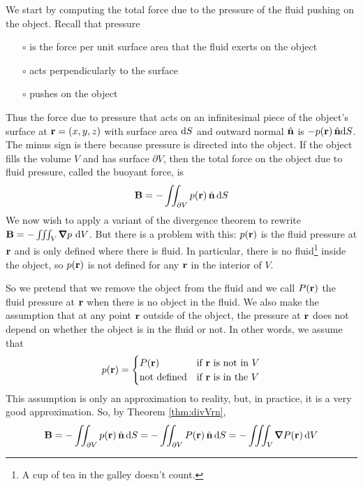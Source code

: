We start by computing the total force due to the pressure of the fluid
pushing on the object. Recall that pressure
\begin{itemize}\itemsep1pt \parskip0pt  %
\item[$\circ$]
is the force per unit surface area that the fluid exerts on the object
\item[$\circ$]
acts perpendicularly to the surface
\item[$\circ$]
pushes on the object
\end{itemize}
Thus the force due to pressure that acts on an infinitesimal
piece of the object's surface at $\mathbf{r}=(x,y,z)$ with surface area $\mathrm{d}S$ and 
outward normal $\hat{\mathbf{n}}$ is $-p(\mathbf{r})\,\hat{\mathbf{n}} \mathrm{d}S$. The minus sign is there because pressure is directed into the object. 
If the object fills the volume $V$ and has surface $\partial
V$, then the total force on the object due to fluid pressure, called
the buoyant force,  is
\begin{equation*}
\mathbf{B}=-\iint_{\partial V}p(\mathbf{r})\,\hat{\mathbf{n}}\,\mathrm{d}S
\end{equation*}
We now wish to apply a variant of the divergence theorem to rewrite
$\vB=-\tripInt_V \vnabla p\ \dee{V}$. But there is a problem with this:
$p(\mathbf{r})$ is the fluid pressure at $\mathbf{r}$ and is only defined where there is
fluid. In particular, there is no fluid\footnote{A cup of tea in the galley 
doesn't count.} inside the object, so $p(\mathbf{r})$ is not
defined for any $\mathbf{r}$ in the interior of $V$. 

So we pretend that we remove 
the object from the fluid and we call $P(\mathbf{r})$ the fluid pressure at $\mathbf{r}$ 
when there is no object in the fluid. We also make the assumption that at 
any point $\mathbf{r}$ outside of the object, the pressure at $\mathbf{r}$ does not depend 
on whether the object is in the fluid or not. In other words, we assume that
\begin{equation*}
p(\mathbf{r})=\begin{cases}
             P(\mathbf{r})& \text{if $\mathbf{r}$ is not in $V$}\\
            \text{not defined} & \text{if $\mathbf{r}$ is in the $V$}
        \end{cases}
\end{equation*}
This assumption is only an approximation to reality, but, in practice,
it is a very good approximation. So, by Theorem \ref{thm:divVrn},
\begin{equation}\label{eq:buoyancy}
\vB=-\dblInt_{\partial V}p(\vr)\,\hn\,\dee{S}
=-\dblInt_{\partial V}P(\vr)\,\hn\,\dee{S}
=-\tripInt_{V}\vnabla P(\vr)\,\dee{V}
\end{equation}


